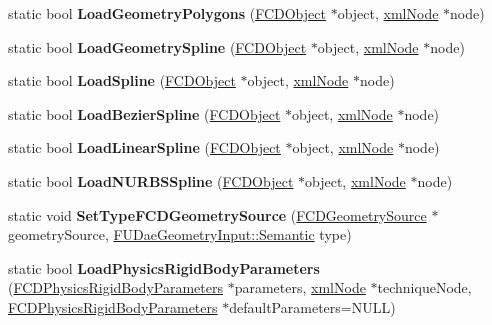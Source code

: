 \begin{DoxyCompactItemize}
\item 
\hypertarget{classFArchiveXML_a0bc5ec838d4bb7b50952d317b4a1bbf0}{
static bool {\bfseries LoadGeometryPolygons} (\hyperlink{classFCDObject}{FCDObject} $\ast$object, \hyperlink{struct__xmlNode}{xmlNode} $\ast$node)}
\label{classFArchiveXML_a0bc5ec838d4bb7b50952d317b4a1bbf0}

\item 
\hypertarget{classFArchiveXML_a2333e909f2b1bcc4b5c9434f205f1750}{
static bool {\bfseries LoadGeometrySpline} (\hyperlink{classFCDObject}{FCDObject} $\ast$object, \hyperlink{struct__xmlNode}{xmlNode} $\ast$node)}
\label{classFArchiveXML_a2333e909f2b1bcc4b5c9434f205f1750}

\item 
\hypertarget{classFArchiveXML_a624aeb310f4820e643e240d088a3151a}{
static bool {\bfseries LoadSpline} (\hyperlink{classFCDObject}{FCDObject} $\ast$object, \hyperlink{struct__xmlNode}{xmlNode} $\ast$node)}
\label{classFArchiveXML_a624aeb310f4820e643e240d088a3151a}

\item 
\hypertarget{classFArchiveXML_abcb8278daa17a482a7c4a396b894d6bb}{
static bool {\bfseries LoadBezierSpline} (\hyperlink{classFCDObject}{FCDObject} $\ast$object, \hyperlink{struct__xmlNode}{xmlNode} $\ast$node)}
\label{classFArchiveXML_abcb8278daa17a482a7c4a396b894d6bb}

\item 
\hypertarget{classFArchiveXML_a8b584c08ceb7b26668d37ef6d5a56d1d}{
static bool {\bfseries LoadLinearSpline} (\hyperlink{classFCDObject}{FCDObject} $\ast$object, \hyperlink{struct__xmlNode}{xmlNode} $\ast$node)}
\label{classFArchiveXML_a8b584c08ceb7b26668d37ef6d5a56d1d}

\item 
\hypertarget{classFArchiveXML_a48c403aa203b02ea9a7a17957cf49fe0}{
static bool {\bfseries LoadNURBSSpline} (\hyperlink{classFCDObject}{FCDObject} $\ast$object, \hyperlink{struct__xmlNode}{xmlNode} $\ast$node)}
\label{classFArchiveXML_a48c403aa203b02ea9a7a17957cf49fe0}

\item 
\hypertarget{classFArchiveXML_a4c3548f119f2bb0c585f95ea44eba284}{
static void {\bfseries SetTypeFCDGeometrySource} (\hyperlink{classFCDGeometrySource}{FCDGeometrySource} $\ast$geometrySource, \hyperlink{namespaceFUDaeGeometryInput_a0f887d29f54b10338ebcf73789a7a061}{FUDaeGeometryInput::Semantic} type)}
\label{classFArchiveXML_a4c3548f119f2bb0c585f95ea44eba284}

\item 
\hypertarget{classFArchiveXML_aefcf31bf5c792c5ee9e961d2e781a4fa}{
static bool {\bfseries LoadPhysicsRigidBodyParameters} (\hyperlink{classFCDPhysicsRigidBodyParameters}{FCDPhysicsRigidBodyParameters} $\ast$parameters, \hyperlink{struct__xmlNode}{xmlNode} $\ast$techniqueNode, \hyperlink{classFCDPhysicsRigidBodyParameters}{FCDPhysicsRigidBodyParameters} $\ast$defaultParameters=NULL)}
\label{classFArchiveXML_aefcf31bf5c792c5ee9e961d2e781a4fa}


\end{DoxyCompactItemize}
